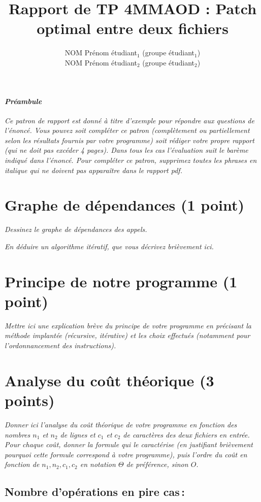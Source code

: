 \documentclass[a4paper,10pt,french]{article}
\title{Rapport de TP 4MMAOD : Patch optimal entre deux fichiers}
\author{
NOM Prénom étudiant$_1$ (groupe étudiant$_1$)
\\ NOM Prénom étudiant$_2$ (groupe étudiant$_2$)
}
\newcounter{question}%
\begin{document}
\maketitle

\paragraph{\em Préambule}
{\em Ce patron de rapport est donné à titre d'exemple pour répondre aux questions de l'énoncé.
Vous pouvez soit compléter ce patron (complètement ou partiellement selon les résultats fournis par votre programme)
soit rédiger votre propre rapport (qui ne doit pas excéder 4 pages). Dans tous les cas l'évaluation suit
le barème indiqué dans l'énoncé.
Pour compléter ce patron, supprimez toutes les phrases en italique qui ne doivent pas apparaître dans le rapport pdf.
}

\section{Graphe de dépendances (1 point)}
{\em Dessinez le graphe de dépendances des appels.}

{\em En déduire un algorithme itératif, que vous décrivez brièvement ici.}

\section{Principe de notre  programme (1 point)}
{\em Mettre ici une explication brève du principe de votre programme en  précisant la méthode implantée (récursive, itérative) et les
choix effectués (notamment pour l'ordonnancement des instructions).
}

\section{Analyse du coût théorique (3 points)}
{\em Donner ici l'analyse du coût théorique de votre programme en fonction des nombres $n_1$ et $n_2$ de lignes
et $c_1$ et $c_2$ de caractères des deux fichiers en entrée.
Pour chaque coût, donner la formule qui le caractérise (en justifiant brièvement pourquoi cette formule correspond à votre programme),
puis l'ordre du coût en fonction de $n_1, n_2, c_1, c_2$ en notation $\Theta$ de préférence, sinon $O$.}

  \subsection{Nombre  d'opérations en pire cas\,: }
\end{document}
